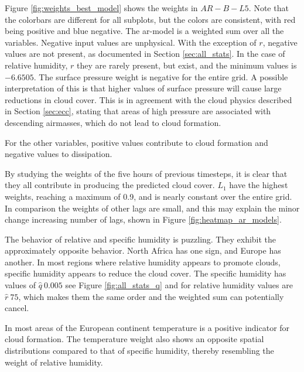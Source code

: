 Figure \ref{fig:weights_best_model} shows the weights in $AR-B-L5$. Note that the colorbars are different for all subplots, but the colors are consistent, with red being positive and blue negative. The \acrshort{ar}-model is a weighted sum over all the variables. Negative input values are unphysical. With the exception of $r$, negative values are not present, as documented in Section \ref{sec:all_stats}. In the case of relative humidity, $r$ they are rarely present, but exist, and the minimum values is $-6.6505$. 
The surface pressure weight is negative for the entire grid. A possible interpretation of this is that higher values of surface pressure will cause large reductions in cloud cover.
This is in agreement with the cloud physics described in Section \ref{sec:ecc}, stating that areas of high pressure are associated with descending airmasses, which do not lead to cloud formation.

For the other variables, positive values contribute to cloud formation and negative values to dissipation.

By studying the weights of the five hours of previous timesteps, it is clear that they all contribute in producing the predicted cloud cover. $L_1$ have the highest weights, reaching a maximum of 0.9, and is nearly constant over the entire grid. 
In comparison the weights of other lags are small, and this may explain the minor change increasing number of lags, shown in Figure \ref{fig:heatmap_ar_models}. 

The behavior of relative and specific humidity is puzzling. They exhibit the approximately opposite behavior. North Africa has one sign, and Europe has another. In most regions where relative humidity appears to promote clouds, specific humidity appears to reduce the cloud cover. 
The specific humidity has values of $\hat{q}~0.005$ see Figure \ref{fig:all_stats_q} and for relative humidity values are $\hat{r}~75$, which makes them the same order and the weighted sum can potentially cancel. 

In most areas of the European continent temperature is a positive indicator for cloud formation. The temperature weight also shows an opposite spatial distributions compared to that of specific humidity, thereby resembling the weight of relative humidity. 
\clearpage

